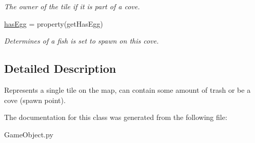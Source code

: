 \begin{DoxyCompactItemize}
\begin{DoxyCompactList}\small\item\em \-The owner of the tile if it is part of a cove. \end{DoxyCompactList}\item 
\hypertarget{classGameObject_1_1Tile_a8a0f1362bf69dac1c9c1615010de27a6}{\hyperlink{classGameObject_1_1Tile_a8a0f1362bf69dac1c9c1615010de27a6}{has\-Egg} = property(get\-Has\-Egg)}\label{classGameObject_1_1Tile_a8a0f1362bf69dac1c9c1615010de27a6}

\begin{DoxyCompactList}\small\item\em \-Determines of a fish is set to spawn on this cove. \end{DoxyCompactList}\end{DoxyCompactItemize}


\subsection{\-Detailed \-Description}
\-Represents a single tile on the map, can contain some amount of trash or be a cove (spawn point). 



\-The documentation for this class was generated from the following file\-:\begin{DoxyCompactItemize}
\item 
\-Game\-Object.\-py\end{DoxyCompactItemize}

